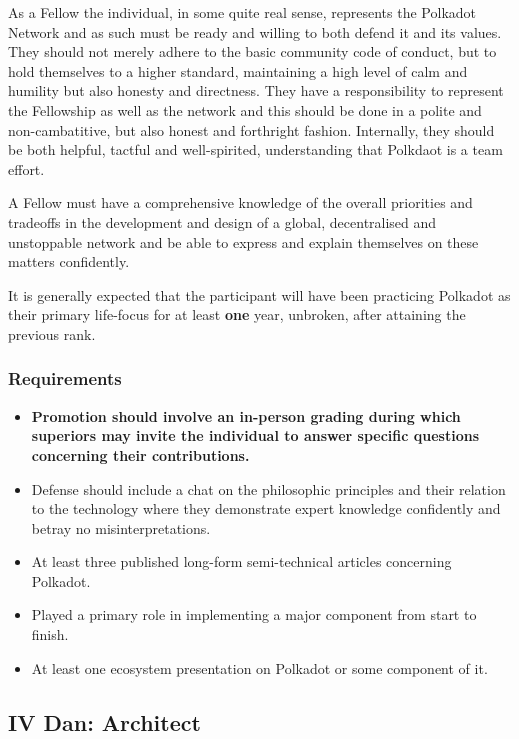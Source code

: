 \documentclass[9pt,oneside]{amsart}
\begin{document}
As a Fellow the individual, in some quite real sense, represents the Polkadot Network and as such must be ready and willing to both defend it and its values. They should not merely adhere to the basic community code of conduct, but to hold themselves to a higher standard, maintaining a high level of calm and humility but also honesty and directness. They have a responsibility to represent the Fellowship as well as the network and this should be done in a polite and non-cambatitive, but also honest and forthright fashion. Internally, they should be both helpful, tactful and well-spirited, understanding that Polkdaot is a team effort.

A Fellow must have a comprehensive knowledge of the overall priorities and tradeoffs in the development and design of a global, decentralised and unstoppable network and be able to express and explain themselves on these matters confidently.

It is generally expected that the participant will have been practicing Polkadot as their primary life-focus for at least \textbf{one} year, unbroken, after attaining the previous rank.

\subsubsection{Requirements}\label{requirements-2}

\begin{itemize}
\item \textbf{Promotion should involve an in-person grading during which superiors may invite the individual to answer specific questions concerning their contributions.}
\item Defense should include a chat on the philosophic principles and their relation to the technology where they demonstrate expert knowledge confidently and betray no misinterpretations.
\item At least three published long-form semi-technical articles concerning Polkadot.
\item Played a primary role in implementing a major component from start to finish.
\item At least one ecosystem presentation on Polkadot or some component of it.
\end{itemize}

\subsection{IV Dan: Architect}\label{iv-dan-architect}~\\
\end{document}
